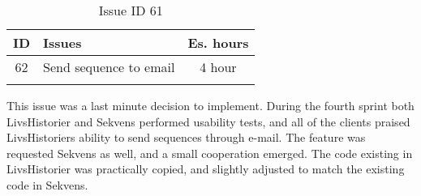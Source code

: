 \begin{longtable} { | c | p{12cm} | c | } 
\hline
	ID 	&	Issues	&		 Es. hours \\\hline
	62	&	Send sequence to email	&	4 hour	\\\hline
\caption{Issue ID 61}
\label{tab:spr4_sequenceemail}
\end{longtable}
 
This issue was a last minute decision to implement. During the fourth sprint both LivsHistorier and Sekvens performed usability tests, and all of the clients praised LivsHistoriers ability to send sequences through e-mail. The feature was requested Sekvens as well, and a small cooperation emerged. The code existing in LivsHistorier was practically copied, and slightly adjusted to match the existing code in Sekvens. 
